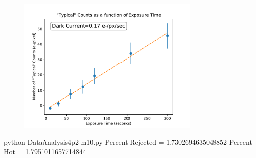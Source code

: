 \documentclass[preprint]{aastex62}
\begin{document}
    
        \begin{figure}
          \centering
            \includegraphics[width=3.5in]{../images/neg10DARK_typical-exposure.pdf}
            \caption{}
          \label{fig:neg10DARK_typical-exposure}
        \end{figure}
    
    python DataAnalysis4p2-m10.py 
    Percent Rejected = 1.7302694635048852
    Percent Hot = 1.7951011657714844
    
    
\end{document}
